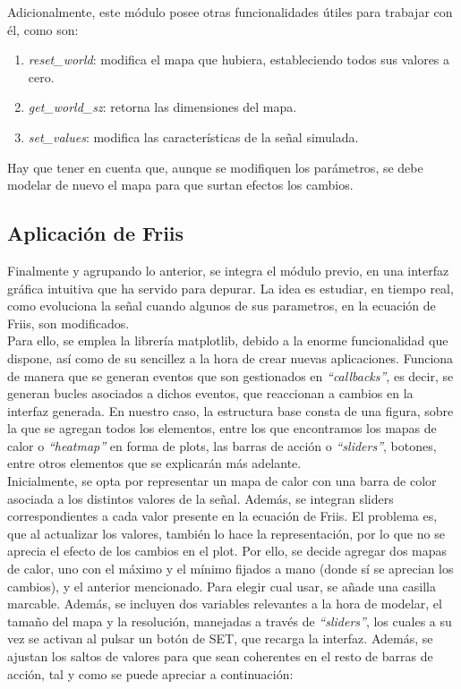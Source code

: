 Adicionalmente, este módulo posee otras funcionalidades útiles para trabajar con él, como son:

\begin{enumerate}
    \item \emph{reset\_world}: modifica el mapa que hubiera, estableciendo todos sus valores a cero.

    \item \emph{get\_world\_sz}: retorna las dimensiones del mapa.

    \item \emph{set\_values}: modifica las características de la señal simulada.
\end{enumerate}

Hay que tener en cuenta que, aunque se modifiquen los parámetros, se debe modelar de nuevo el mapa para que surtan efectos los cambios.\\

\subsection{Aplicación de Friis}
\label{subsec:friis-app}

Finalmente y agrupando lo anterior, se integra el módulo previo, en una interfaz gráfica intuitiva que ha servido para depurar. La idea es estudiar, en tiempo real, como evoluciona la señal cuando algunos de sus parametros, en la ecuación de Friis, son modificados.\\

Para ello, se emplea la librería matplotlib, debido a la enorme funcionalidad que dispone, así como de su sencillez a la hora de crear nuevas aplicaciones. Funciona de manera que se generan eventos que son gestionados en \emph{``callbacks''}, es decir, se generan bucles asociados a dichos eventos, que reaccionan a cambios en la interfaz generada. En nuestro caso, la estructura base consta de una figura, sobre la que se agregan todos los elementos, entre los que encontramos los mapas de calor o \emph{``heatmap''} en forma de plots, las barras de acción o \emph{``sliders''}, botones, entre otros elementos que se explicarán más adelante.\\

Inicialmente, se opta por representar un mapa de calor con una barra de color asociada a los distintos valores de la señal. Además, se integran sliders correspondientes a cada valor presente en la ecuación de Friis. El problema es, que al actualizar los valores, también lo hace la representación, por lo que no se aprecia el efecto de los cambios en el plot. Por ello, se decide agregar dos mapas de calor, uno con el máximo y el mínimo fijados a mano (donde sí se aprecian los cambios), y el anterior mencionado. Para elegir cual usar, se añade una casilla marcable. Además, se incluyen dos variables relevantes a la hora de modelar, el tamaño del mapa y la resolución, manejadas a través de \emph{``sliders''}, los cuales a su vez se activan al pulsar un botón de SET, que recarga la interfaz. Además, se ajustan los saltos de valores para que sean coherentes en el resto de barras de acción, tal y como se puede apreciar a continuación:\\

